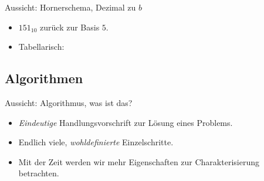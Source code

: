 \begin{frame}{Aussicht: Hornerschema, Dezimal zu \(b\)}
    \begin{itemize}[]
        \item \pause \(151_{10}\) zurück zur Basis \(5\).
        \item \pause Tabellarisch: 
    \end{itemize}
\end{frame}

\subsection{Algorithmen}
\begin{frame}{Aussicht: Algorithmus, was ist das?}
    \begin{itemize}[<+(1)->]
        \itemsep11pt
        \item \emph{Eindeutige} Handlungsvorschrift zur Lösung eines Problems.
        \item Endlich viele, \emph{wohldefinierte}  Einzelschritte.
        \item Mit der Zeit werden wir mehr Eigenschaften zur Charakterisierung betrachten.%
    \end{itemize}
\end{frame}

